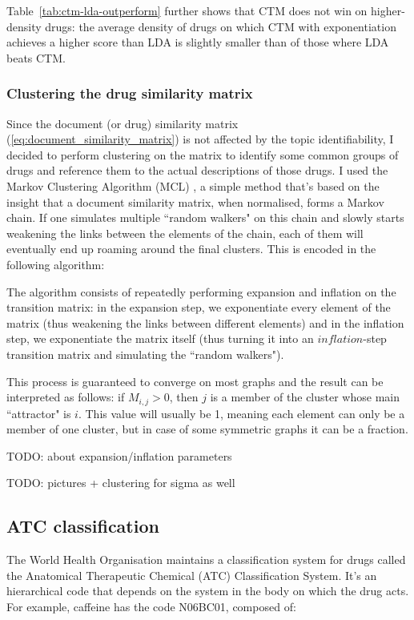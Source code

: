 \documentclass[12pt,a4paper,twoside,openright]{report}
\begin{document}
Table~\ref{tab:ctm-lda-outperform} further shows that CTM does not win on higher-density drugs: the average density of drugs on which CTM with exponentiation achieves a higher score than LDA is slightly smaller than of those where LDA beats CTM.

\subsubsection{Clustering the drug similarity matrix}
Since the document (or drug) similarity matrix (\ref{eq:document_similarity_matrix}) is not affected by the topic identifiability, I decided to perform clustering on the matrix to identify some common groups of drugs and reference them to the actual descriptions of those drugs.
I used the Markov Clustering Algorithm (MCL)  \cite{Dongen:2000:CAG:868986}, a simple method that's based on the insight that a document similarity matrix, when normalised, forms a Markov chain. If one simulates multiple ``random walkers" on this chain and slowly starts weakening the links between the elements of the chain, each of them will eventually end up roaming around the final clusters. This is encoded in the following algorithm:



The algorithm consists of repeatedly performing expansion and inflation on the transition matrix: in the expansion step, we exponentiate every element of the matrix (thus weakening the links between different elements) and in the inflation step, we exponentiate the matrix itself (thus turning it into an $\mathit{inflation}$-step transition matrix and simulating the ``random walkers").

This process is guaranteed to converge on most graphs and the result can be interpreted as follows: if $M_{i,j} > 0$, then $j$ is a member of the cluster whose main ``attractor" is $i$. This value will usually be 1, meaning each element can only be a member of one cluster, but in case of some symmetric graphs it can be a fraction.

TODO: about expansion/inflation parameters

TODO: pictures + clustering for sigma as well

\subsection{ATC classification}

The World Health Organisation maintains a classification system for drugs called the Anatomical Therapeutic Chemical (ATC) Classification System. It's an hierarchical code that depends on the system in the body on which the drug acts. For example, caffeine has the code N06BC01, composed of:
\end{document}
